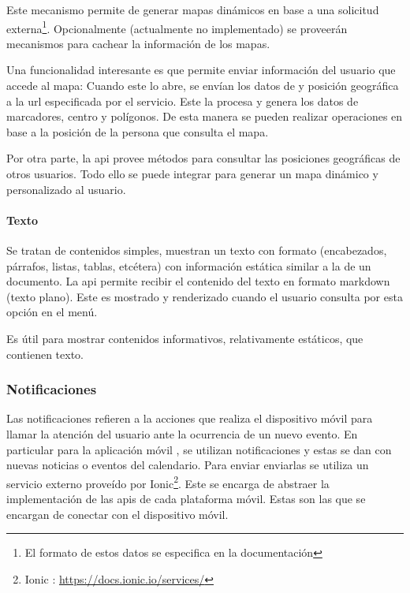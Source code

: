 Este mecanismo permite de generar mapas dinámicos en base a una solicitud externa\footnote{El formato de estos datos se especifica en la documentación}. Opcionalmente (actualmente no implementado) se proveerán mecanismos para cachear la información de los mapas.


Una funcionalidad interesante es que permite enviar información del usuario que accede al mapa: Cuando este lo abre, se envían los datos de  y posición geográfica a la \gls{url} especificada por el servicio. Este la procesa y genera los datos de marcadores, centro y polígonos. De esta manera se pueden realizar operaciones en base a la posición de la persona que consulta el mapa.

Por otra parte, la \gls{api} provee métodos para consultar las posiciones geográficas de otros usuarios. Todo ello se puede integrar para generar un mapa dinámico y personalizado al usuario.

\paragraph{Texto}
\label{funcionalidad_contenidos_texto} 

Se tratan de contenidos simples, muestran un texto con formato (encabezados, párrafos, listas, tablas, etcétera) con información estática similar a la de un documento. 
La \gls{api} permite recibir el contenido del texto en formato \gls{markdown} (texto plano). Este es mostrado y renderizado cuando el usuario consulta por esta opción en el menú.

Es útil para mostrar contenidos informativos, relativamente estáticos, que contienen texto.

\subsubsection{Notificaciones}
\label{funcionalidad_notificaciones}

Las notificaciones refieren a la acciones que realiza el dispositivo móvil para llamar la atención del usuario ante la ocurrencia de un nuevo evento. En particular para la aplicación móvil \nombreApp{}, se utilizan notificaciones  y estas se dan con nuevas noticias o eventos del calendario. Para enviar enviarlas se utiliza un servicio externo proveído por Ionic\footnote{Ionic : \url{https://docs.ionic.io/services/}}. Este se encarga de abstraer la implementación de las \glspl{api} de cada plataforma móvil. Estas son las que se encargan de conectar con el dispositivo móvil.

